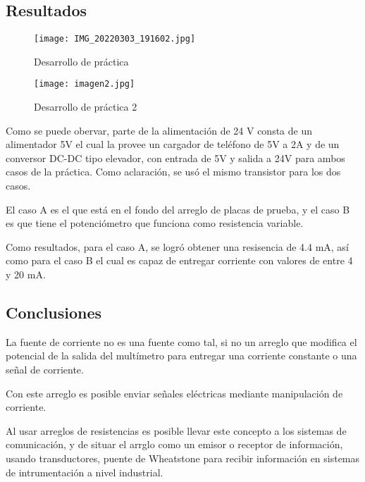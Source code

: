 \subsection{Resultados}

\begin{figure}[htb]
    \centering
    \texttt{[image: IMG\_20220303\_191602.jpg]}
    \caption{Desarrollo de práctica}
    \label{Fig: Desarrollo de práctica 1}
\end{figure}

\begin{figure}[htb]
    \centering
    \texttt{[image: imagen2.jpg]}
    \caption{Desarrollo de práctica 2}
    \label{Fig: Desarrollo de práctica 2}
\end{figure}

Como se puede obervar, parte de la alimentación de 24 V consta de un alimentador 5V el cual la provee un cargador de teléfono
de 5V a 2A y de un conversor DC-DC tipo elevador, con entrada de 5V y salida a 24V para ambos casos de la práctica. Como 
aclaración, se usó el mismo transistor para los dos casos. 

El caso A es el que está en el fondo del arreglo de placas de prueba, y el caso B es que tiene el potenciómetro que funciona
como resistencia variable.

Como resultados, para el caso A, se logró obtener una resisencia de 4.4 mA, así como para el caso B el cual es capaz de entregar
corriente con valores de entre 4 y 20 mA.


\subsection{Conclusiones}
La fuente de corriente no es una fuente como tal, si no un arreglo que modifica el potencial de la salida del multímetro
para entregar una corriente constante o una señal de corriente.

Con este arreglo es posible enviar señales eléctricas mediante manipulación de corriente.

Al usar arreglos de resistencias es posible llevar este concepto a los sistemas de comunicación, y de situar el arrglo como
un emisor o receptor de información, usando transductores, puente de Wheatstone para recibir información en sistemas de
intrumentación a nivel industrial.

